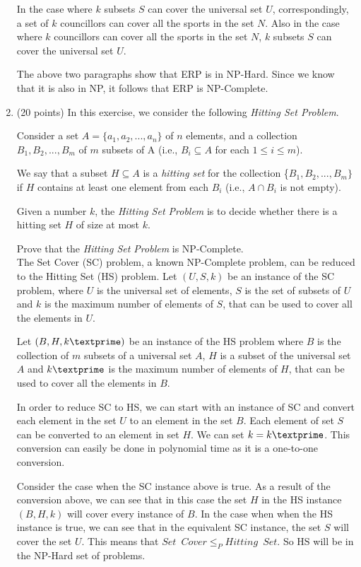 \documentclass[paper=a4, fontsize=11pt]{scrartcl} %
\numberwithin{equation}{section} %
\numberwithin{figure}{section} %
\numberwithin{table}{section} %
\begin{document}
\begin{enumerate}
In the case where $k$ subsets $S$ can cover the universal set $U$, correspondingly, a set of $k$ councillors can cover all the sports in the set $N$. Also in the case where $k$ councillors can cover all the sports in the set $N$, $k$ subsets $S$ can cover the universal set $U$. 

The above two paragraphs show that ERP is in NP-Hard. Since we know that it is also in NP, it follows that ERP is NP-Complete.\\

\item (20 points) In this exercise, we consider the following \textit{Hitting Set Problem}.

Consider a set $A = \{a_1,a_2,...,a_n\}$ of $n$ elements, and a collection $B_1,B_2,...,B_m$ of $m$ subsets of A (i.e., $B_i \subseteq A$ for each $1\le i \le m$).

We say that a subset $H \subseteq A$ is a \textit{hitting set} for the collection \{$B_1,B_2,...,B_m\}$ if $H$ contains at least one element from each $B_i$ (i.e., $A \cap B_i$ is not empty).

Given a number $k$, the \textit{Hitting Set Problem} is to decide whether there is a hitting set $H$ of size at most $k$.

Prove that the \textit{Hitting Set Problem} is NP-Complete.\\

The Set Cover (SC) problem, a known NP-Complete problem, can be reduced to the Hitting Set (HS) problem. Let $(U, S, k)$ be an instance of the SC problem, where $U$ is the universal set of elements, $S$ is the set of subsets of $U$ and $k$ is the maximum number of elements of $S$, that can be used to cover all the elements in $U$. 

Let $(B, H, k\textprime)$ be an instance of the HS problem where $B$ is the collection of $m$ subsets of a universal set $A$, $H$ is a subset of the universal set $A$ and $k\textprime$ is the maximum number of elements of $H$, that can be used to cover all the elements in $B$. 

In order to reduce SC to HS, we can start with an instance of SC and convert each element in the set $U$ to an element in the set $B$. Each element of set $S$ can be converted to an element in set $H$. We can set $k=k\textprime$. This conversion can easily be done in polynomial time as it is a one-to-one conversion.

Consider the case when the SC instance above is true. As a result of the conversion above, we can see that in this case the set $H$ in the HS instance $(B, H, k)$ will cover every instance of $B$. In the case when when the HS instance is true, we can see that in the equivalent SC instance, the set $S$ will cover the set $U$. This means that $Set \enspace Cover \le_P Hitting \enspace Set$. So HS will be in the NP-Hard set of problems.


\end{enumerate}
\end{document}

